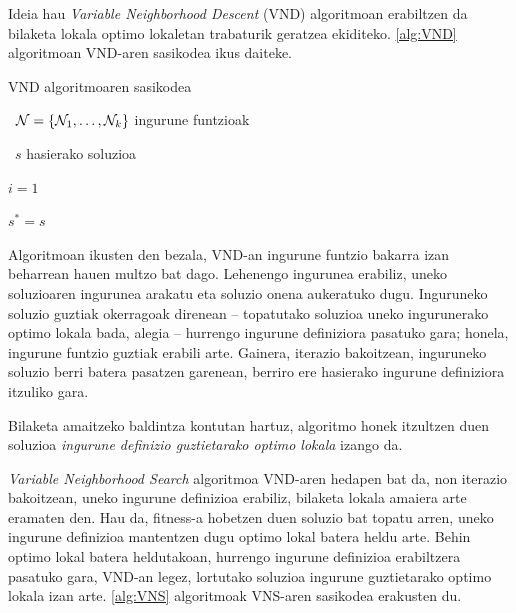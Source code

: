 \documentclass[eu]{ifirak}\usepackage[]{graphicx}\usepackage[]{color}
\begin{document}
Ideia hau \textit{Variable Neighborhood Descent} (VND) algoritmoan erabiltzen da bilaketa lokala optimo lokaletan trabaturik geratzea ekiditeko. \ref{alg:VND} algoritmoan VND-aren sasikodea ikus daiteke. 

\begin{ifalgorithm}[t]
\begin{ifpseudo}{VND algoritmoaren sasikodea}
\item \In\ $\mathbf{\cal N} = \{{\cal N}_1,\ldots,{\cal N}_k\}$ ingurune funtzioak
\item \In\ $s$ hasierako soluzioa
\item  $i=1$
\item  $s^* = s$
\item {} \Do
\item {}
\item {}
\item {}
\item {}
\item \T{\Else}
\item {}
\item \T{\EIf}
\item \Done
\end{ifpseudo}
\caption{VND algoritmoaren sasikodea}\label{alg:VND}
\end{ifalgorithm}

Algoritmoan ikusten den bezala, VND-an ingurune funtzio bakarra izan beharrean hauen multzo bat dago. Lehenengo ingurunea erabiliz, uneko soluzioaren ingurunea arakatu eta soluzio onena aukeratuko dugu. Inguruneko soluzio guztiak okerragoak direnean -- topatutako soluzioa uneko ingurunerako optimo lokala bada, alegia -- hurrengo ingurune definiziora pasatuko gara; honela, ingurune funtzio guztiak erabili arte. Gainera, iterazio bakoitzean, inguruneko soluzio berri batera pasatzen garenean, berriro ere hasierako ingurune definiziora itzuliko gara.

Bilaketa amaitzeko baldintza kontutan hartuz, algoritmo honek itzultzen duen soluzioa \textit{ingurune definizio guztietarako optimo lokala} izango da.

\textit{Variable Neighborhood Search} algoritmoa VND-aren hedapen bat da, non iterazio bakoitzean, uneko ingurune definizioa erabiliz, bilaketa lokala amaiera arte eramaten den. Hau da, fitness-a hobetzen duen soluzio bat topatu arren, uneko ingurune definizioa mantentzen dugu optimo lokal batera heldu arte. Behin optimo lokal batera heldutakoan, hurrengo ingurune definizioa erabiltzera pasatuko gara, VND-an legez, lortutako soluzioa ingurune guztietarako optimo lokala izan arte. \ref{alg:VNS} algoritmoak VNS-aren sasikodea erakusten du.
\end{document}
